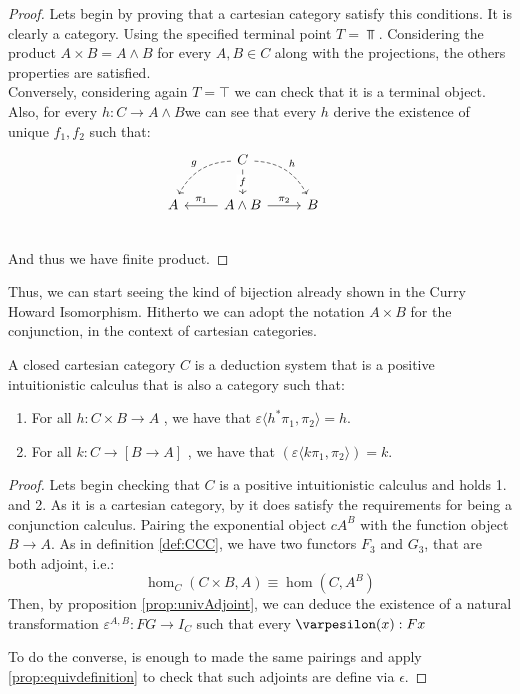 \begin{proof}

  Lets begin by proving that a cartesian category satisfy this conditions. It is clearly a category. Using the specified terminal point $T=\Top$.  Considering the product $A\times B = A\land B$ for every $A,B \in C$ along with the projections, the others properties are satisfied.\\

  Conversely, considering again $T= \top$ we can check that it is a terminal object. Also, for every $h:C\to A\land B$we can see that every $h$ derive the existence of unique $f_1,f_2$ such that:
  \[
\begin{tikzcd}
{} & C \arrow[bend right,swap,dashed]{dl}{g}
\arrow[bend left,dashed]{dr}{h} \arrow{d}[description]{f}& & \\
A  &A\land B \arrow{l}[swap]{\pi_1} \arrow{r}{\pi_2} & 
B \\
\end{tikzcd}
\]
 And thus we have finite product.
\end{proof}

Thus, we can start seeing the kind of bijection already shown in the Curry Howard Isomorphism. Hitherto we can adopt the notation $A\times B$ for the conjunction, in the context of cartesian categories.
\begin{proposition}\label{def2:CCC}
  A closed cartesian category $C$ is a deduction system that is a positive intuitionistic calculus that is also a category such that:
  \begin{enumerate}
  \item   For all $h: C\times B \to A$ , we have that $\varepsilon \langle h^* \pi_1, \pi_2\rangle = h$.
  \item   For all $k: C\to [B \to A]$ , we have that $(\varepsilon \langle k \pi_1, \pi_2\rangle) = k$.
  \end{enumerate}
\end{proposition}

\begin{proof}
  Lets begin checking that $C$ is a positive intuitionistic calculus and holds 1. and 2. As it is a cartesian category, by it does satisfy the requirements for being a conjunction calculus. Pairing the exponential object $cA^B$ with the function object $B\to A$. As in definition \ref{def:CCC}, we have two functors $F_3$ and $G_3$, that are both adjoint, i.e.:
  $$\hom_C(C \times B, A) \equiv \hom(C, A^B)$$
  Then, by proposition \ref{prop:univAdjoint}, we can deduce the existence of a natural transformation  $\varepsilon^{A,B}: FG \to I_C$ such that every $\varpesilon(x): F x $


  
  To do the converse, is enough to made the same pairings and apply \ref{prop:equivdefinition} to check that such adjoints are define via $\epsilon$.
\end{proof}

